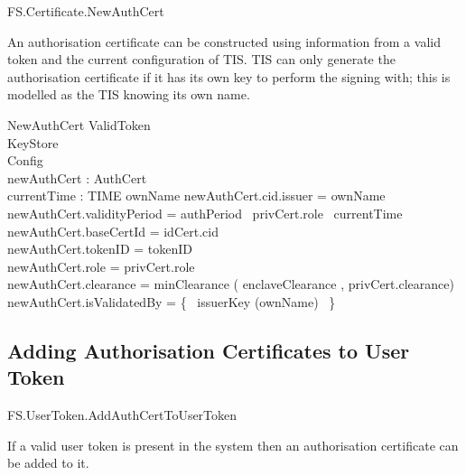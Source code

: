 \begin{traceunit}{FS.Certificate.NewAuthCert}
\end{traceunit}

An authorisation certificate can be constructed using information from
a valid token and the current configuration of TIS.
TIS can only generate the authorisation certificate if it has its own
key to perform the signing with; this is modelled as the TIS knowing
its own name.

\begin{schema}{NewAuthCert}
        ValidToken
\\      KeyStore
\\      Config
\\      newAuthCert : AuthCert
\\      currentTime : TIME
\where
        ownName \neq \Nil
\also
        newAuthCert.cid.issuer = \The ownName
\\      newAuthCert.validityPeriod = authPeriod~ privCert.role~
currentTime
\\      newAuthCert.baseCertId = idCert.cid
\\      newAuthCert.tokenID = tokenID
\\      newAuthCert.role = privCert.role
\\      newAuthCert.clearance = minClearance ( enclaveClearance ,
privCert.clearance)
\\      newAuthCert.isValidatedBy = \{~ issuerKey (\The ownName) ~\} 
\end{schema}



\subsection{Adding Authorisation Certificates to User Token}

\begin{traceunit}{FS.UserToken.AddAuthCertToUserToken}
\end{traceunit}


If a valid user token is present in the system then an authorisation
certificate can be added to it.


